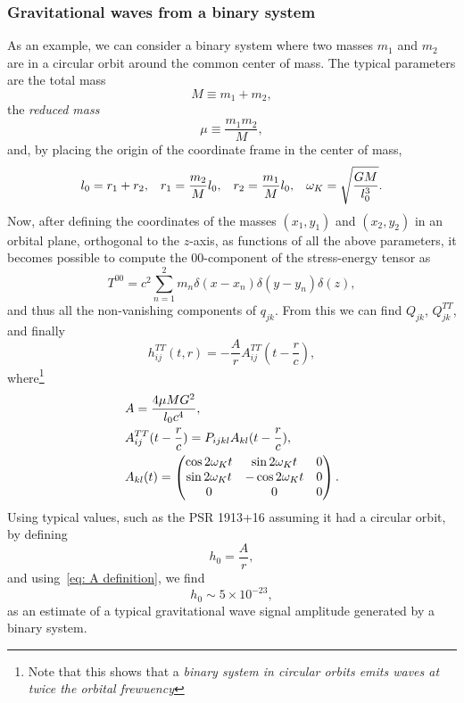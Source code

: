 \subsubsection{Gravitational waves from a binary system}
As an example, we can consider a binary system where two masses $m_1$ and $m_2$ are in a circular orbit around the common center of mass.
The typical parameters are the total mass
\[
    M\equiv m_1+m_2,
\]
the \textit{reduced mass}
\[
    \mu\equiv \frac{m_1m_2}{M},
\]
and, by placing the origin of the coordinate frame in the center of mass, 
\[
    l_0 = r_1+r_2, \hspace{3mm} r_1=\frac{m_2}{M}l_0, \hspace{3mm} r_2=\frac{m_1}{M}l_0, \hspace{3mm} \omega_K=\sqrt{ \frac{GM}{l_0^3}}.
\]
Now, after defining the coordinates of the masses $(x_1,y_1)$ and $(x_2,y_2)$ in an orbital plane, orthogonal to the $z$-axis, as functions of all the above parameters, it becomes possible to compute the 00-component of the stress-energy tensor as
\[
T^{00}=c^2\sum^2_{n=1}m_n\delta(x-x_n)\delta(y-y_n)\delta(z),
\]
and thus all the non-vanishing components of $q_{jk}$.
From this we can find $Q_{jk}$, $Q_{jk}^{TT}$, and finally
\begin{equation}
    h_{ij}^{TT}(t,r) = -\frac{A}{r}A_{ij}^{TT}(t-\frac{r}{c}),
    \label{eq: binary system general strain solution}
\end{equation}
where\footnote{Note that this shows that a \textit{binary system in circular orbits emits waves at twice the orbital frewuency}} 
\begin{align}
    & A=\frac{4\mu MG^2}{l_0c^4}, \notag\\
    & A_{ij}^{TT}(t-\frac{r}{c}) = P_{ijkl}A_{kl}(t-\frac{r}{c}),\notag\\ 
    \vspace{2mm}
    &    A_{kl}(t) =  
    \begin{pmatrix}
        \cos{2\omega_Kt} & \sin{2\omega_Kt} & 0 \\
     \sin{2\omega_Kt} &  -\cos{2\omega_Kt}& 0 \\
     0 & 0 & 0 \\
    \end{pmatrix}.
    \label{eq: A definition}
\end{align}
Using typical values, such as the PSR 1913+16 assuming it had a circular orbit, by defining 
\[
    h_0=\frac{A}{r},
\]
and using~\eqref{eq: A definition}, we find  
\[
    h_0\sim 5\times10^{-23}, 
\]
as an estimate of a typical gravitational wave signal amplitude generated by a binary system.

